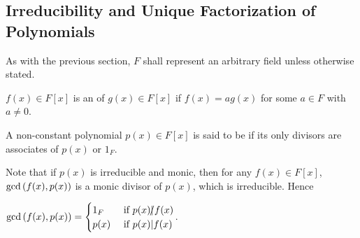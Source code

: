 \documentclass[11pt,fleqn,dvipsnames,usenames]{article}
\newcommand{\p}{\noindent}
\begin{document}
\subsection{Irreducibility and Unique Factorization of Polynomials}

\p As with the previous section, $F$ shall represent an arbitrary field unless otherwise stated.

\begin{definition}
$f(x)\in F[x]$ is an  of $g(x)\in F[x]$ if $f(x) = ag(x)$ for some $a\in F$ with $a\neq 0$.
\end{definition}
%
\begin{definition}
A non-constant polynomial $p(x)\in F[x]$ is said to be  if its only divisors are associates of $p(x)$ or $1_{F}$.
\end{definition}
%
\begin{remark}\label{oneorppoly}
Note that if $p(x)$ is irreducible and monic, then for any $f(x)\in F[x]$, $\text{gcd}\left(f(x),p(x)\right)$ is a monic divisor of $p(x)$, which is irreducible.  Hence
\begin{center}
$\text{gcd}\left(f(x),p(x)\right) = \begin{cases}1_{F} & \text{ if }p(x)|\kern-0.9ex{/} f(x)\\p(x) & \text{ if }p(x)|f(x)\end{cases}$.
\end{center}
\end{remark}
\vsp
\end{document}
